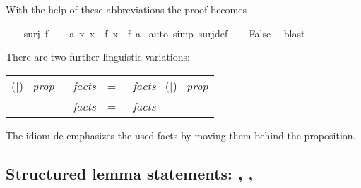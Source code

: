 \begin{isabellebody}
\begin{isamarkuptext}
\noindent
With the help of these abbreviations the proof becomes%
\end{isamarkuptext}%
\isamarkuptrue%
%
\isadelimproof
%
\endisadelimproof
%
\isatagproof
{}\isamarkupfalse%
\isanewline
\ \ \isamarkupfalse%
\ {}surj\ f{}\isanewline
\ \ \isamarkupfalse%
\ {}{}a{}\ {}x{}\ x\ {}\ f\ x{}\ {}\ f\ a{}\ \isamarkupfalse%
{}auto\ simp{}\ surj{}def{}\isanewline
\ \ \isamarkupfalse%
\ {}False{}\ \isamarkupfalse%
\ blast\isanewline
{}\isamarkupfalse%
%
\endisatagproof
{\isafoldproof}%
%
\isadelimproof
%
\endisadelimproof
%
\begin{isamarkuptext}%
There are two further linguistic variations:
\medskip

\begin{tabular}{rcl}
(\isacom{have}$\mid$\isacom{show}) \ \textit{prop} \ \isacom{using} \ \textit{facts}
&=&
\isacom{from} \ \textit{facts} \ (\isacom{have}$\mid$\isacom{show}) \ \textit{prop}\\
\isacom{with} \ \textit{facts} &=& \isacom{from} \ \textit{facts} \isa{this}
\end{tabular}
\medskip

\noindent The  idiom de-emphasizes the used facts by moving them
behind the proposition.

\subsection{Structured lemma statements: , , }


\end{isamarkuptext}
\end{isabellebody}
